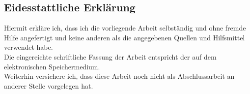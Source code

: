 
\begin{declaration}

    \vfill
    \subsection*{Eidesstattliche Erklärung}

    Hiermit erkläre ich, dass ich die vorliegende Arbeit selbständig und
    ohne fremde Hilfe angefertigt und
    keine anderen als die angegebenen Quellen und Hilfsmittel verwendet habe.\\
    Die eingereichte schriftliche Fassung der Arbeit entspricht der auf dem elektronischen Speichermedium.\\
    Weiterhin versichere ich, dass diese Arbeit noch nicht als Abschlussarbeit an anderer Stelle vorgelegen hat.\\

\end{declaration}

